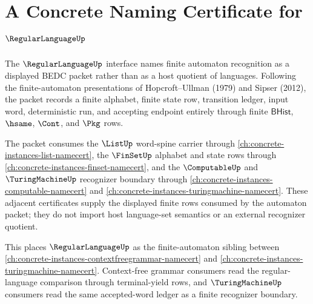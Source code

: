 \chapter{A Concrete Naming Certificate for $\RegularLanguageUp$}
\label{ch:concrete-instances-regularlanguage-namecert}

The $\RegularLanguageUp$ interface names finite automaton recognition as a
displayed BEDC packet rather than as a host quotient of languages. Following
the finite-automaton presentations of Hopcroft--Ullman (1979) and Sipser
(2012), the packet records a finite alphabet, finite state row, transition
ledger, input word, deterministic run, and accepting endpoint entirely through
finite $\mathsf{BHist}$, $\hsame$, $\Cont$, and $\Pkg$ rows.

The packet consumes the $\ListUp$ word-spine carrier through
\autoref{ch:concrete-instances-list-namecert}, the $\FinSetUp$ alphabet and
state rows through \autoref{ch:concrete-instances-finset-namecert}, and the
$\ComputableUp$ and $\TuringMachineUp$ recognizer boundary through
\autoref{ch:concrete-instances-computable-namecert} and
\autoref{ch:concrete-instances-turingmachine-namecert}. These adjacent
certificates supply the displayed finite rows consumed by the automaton
packet; they do not import host language-set semantics or an external
recognizer quotient.

This places $\RegularLanguageUp$ as the finite-automaton sibling between
\autoref{ch:concrete-instances-contextfreegrammar-namecert} and
\autoref{ch:concrete-instances-turingmachine-namecert}. Context-free grammar
consumers read the regular-language comparison through terminal-yield rows,
and $\TuringMachineUp$ consumers read the same accepted-word ledger as a
finite recognizer boundary.

